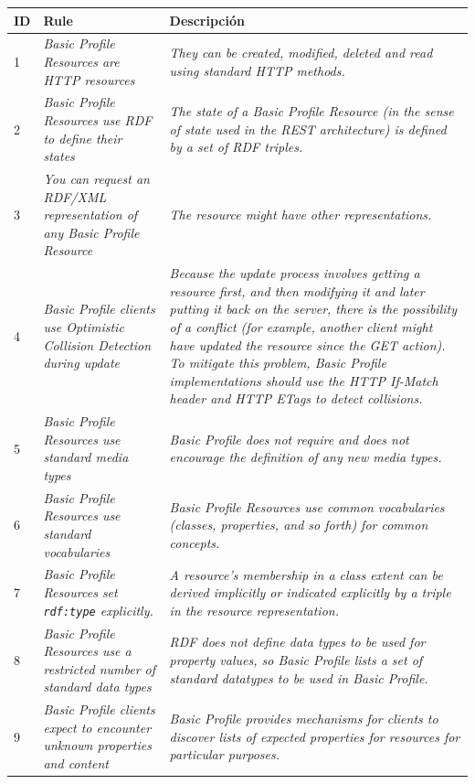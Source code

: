 \begin{longtable}[c]{|l|p{7cm}|p{8cm}|} 
\hline
  \textbf{ID} & \textbf{Rule} & \textbf{Descripción} \\\hline
\endhead
  1 &  \textit{Basic Profile Resources are \gls{HTTP} resources} & \textit{They can be created, modified, deleted and read using standard HTTP methods.}\\ \hline
  2 &  \textit{Basic Profile Resources use \gls{RDF} to define their states} & \textit{The state of a Basic Profile Resource (in the sense of state used in the REST architecture) is defined by a set of RDF triples.} \\ \hline
  3 &  \textit{You can request an RDF/XML representation of any Basic Profile Resource} &   \textit{The resource might have other representations.} \\ \hline
  4 &  \textit{Basic Profile clients use Optimistic Collision Detection during update} &   \textit{Because the update process involves getting a resource first, and then modifying it and later putting it back on the server, there is the possibility of a conflict (for example, another client might have updated the resource since the GET action). To mitigate this problem, Basic Profile implementations should use the HTTP If-Match header and HTTP ETags to detect collisions.} \\ \hline
  5 &  \textit{Basic Profile Resources use standard media types} &   \textit{ Basic Profile does not require and does not encourage the definition of any new media types.} \\ \hline
  6 &  \textit{Basic Profile Resources use standard vocabularies} &   \textit{Basic Profile Resources use common vocabularies (classes, properties, and so forth) for common concepts.} \\ \hline
  7 &  \textit{Basic Profile Resources set \texttt{rdf:type} explicitly.} &   \textit{A resource's membership in a class extent can be derived implicitly or indicated explicitly by a triple in the resource representation.} \\ \hline
  8 &  \textit{Basic Profile Resources use a restricted number of standard data types} &   \textit{RDF does not define data types to be used for property values, so Basic Profile lists a set of standard datatypes to be used in Basic Profile.} \\ \hline
  9 &  \textit{Basic Profile clients expect to encounter unknown properties and content} &   \textit{Basic Profile provides mechanisms for clients to discover lists of expected properties for resources for particular purposes.} \\ \hline

\end{longtable}
